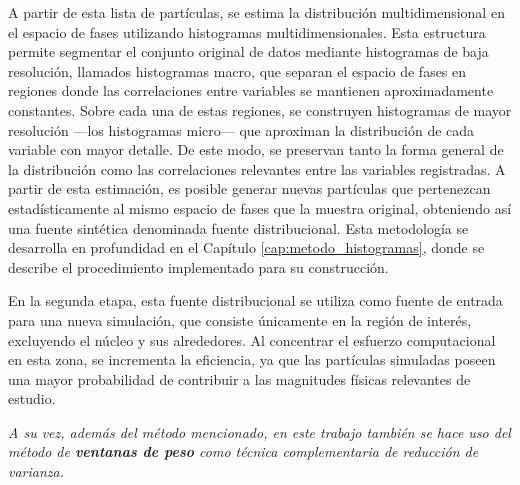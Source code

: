 A partir de esta lista de partículas, se estima la distribución multidimensional en el espacio de fases utilizando histogramas multidimensionales. Esta estructura permite segmentar el conjunto original de datos mediante histogramas de baja resolución, llamados histogramas macro, que separan el espacio de fases en regiones donde las correlaciones entre variables se mantienen aproximadamente constantes. Sobre cada una de estas regiones, se construyen histogramas de mayor resolución —los histogramas micro— que aproximan la distribución de cada variable con mayor detalle. De este modo, se preservan tanto la forma general de la distribución como las correlaciones relevantes entre las variables registradas. A partir de esta estimación, es posible generar nuevas partículas que pertenezcan estadísticamente al mismo espacio de fases que la muestra original, obteniendo así una fuente sintética denominada fuente distribucional. Esta metodología se desarrolla en profundidad en el Capítulo \ref{cap:metodo_histogramas}, donde se describe el procedimiento implementado para su construcción.


En la segunda etapa, esta fuente distribucional se utiliza como fuente de entrada para una nueva simulación, que consiste únicamente en la región de interés, excluyendo el núcleo y sus alrededores. Al concentrar el esfuerzo computacional en esta zona, se incrementa la eficiencia, ya que las partículas simuladas poseen una mayor probabilidad de contribuir a las magnitudes físicas relevantes de estudio.

\emph{A su vez, además del método mencionado, en este trabajo también se hace uso del método de \textbf{ventanas de peso} como técnica complementaria de reducción de varianza.}


